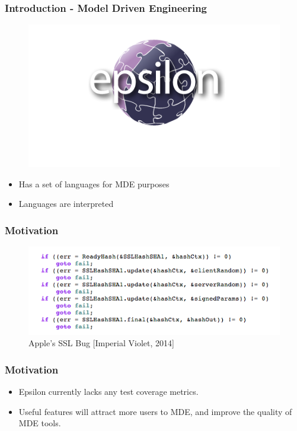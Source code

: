 \begin{frame}
\frametitle{Introduction - Model Driven Engineering}

	\begin{figure}
	\centering
	\includegraphics[scale=0.5]{./presentation/images/epsilon}
	\end{figure}
	
	\begin{itemize}
	\item Has a set of languages for MDE purposes
	\item Languages are interpreted
	\end{itemize}
\end{frame}

\begin{frame}
\frametitle{Motivation}
	\begin{figure}
		\centering
		\includegraphics[width=0.758\linewidth]{figures/appleBug.png}
		\caption{Apple's SSL Bug [Imperial Violet, 2014]}
	\end{figure}
\end{frame}


\begin{frame}
\frametitle{Motivation}
\begin{itemize}
\item Epsilon currently lacks any test coverage metrics.
\item Useful features will attract more users to MDE, and improve the quality of MDE tools.
\end{itemize}
\end{frame}


